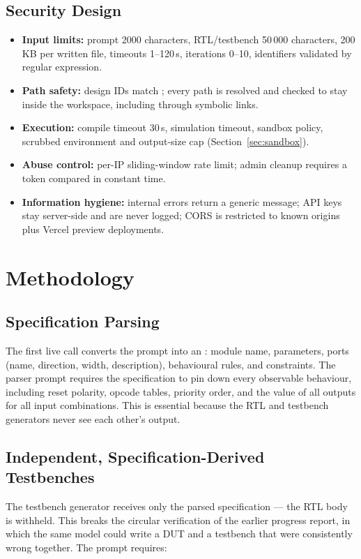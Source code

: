 \documentclass[11pt,a4paper]{article}
\newcommand{\code}[1]{\texttt{\detokenize{#1}}}
\begin{document}
\subsection{Security Design}
\label{sec:security}
\begin{itemize}
\item \textbf{Input limits:} prompt 2000 characters, RTL/testbench 50\,000 characters, 200\,KB per written file, timeouts 1--120\,s, iterations 0--10, identifiers validated by regular expression.
\item \textbf{Path safety:} design IDs match \code{^[a-zA-Z0-9_-]\{1,32\}$}; every path is resolved and checked to stay inside the workspace, including through symbolic links.
\item \textbf{Execution:} compile timeout 30\,s, simulation timeout, sandbox policy, scrubbed environment and output-size cap (Section~\ref{sec:sandbox}).
\item \textbf{Abuse control:} per-IP sliding-window rate limit; admin cleanup requires a token compared in constant time.
\item \textbf{Information hygiene:} internal errors return a generic message; API keys stay server-side and are never logged; CORS is restricted to known origins plus Vercel preview deployments.
\end{itemize}

\section{Methodology}
\label{sec:method}

\subsection{Specification Parsing}
The first live call converts the prompt into an \code{RTLDesignSpec}: module name,
parameters, ports (name, direction, width, description), behavioural rules, and
constraints. The parser prompt requires the specification to pin down every
observable behaviour, including reset polarity, opcode tables, priority order, and
the value of all outputs for all input combinations. This is essential because the
RTL and testbench generators never see each other's output.

\subsection{Independent, Specification-Derived Testbenches}
\label{sec:tb}
The testbench generator receives only the parsed specification --- the RTL body is
withheld. This breaks the circular verification of the earlier progress report, in
which the same model could write a DUT and a testbench that were consistently wrong
together. The prompt requires:
\end{document}
